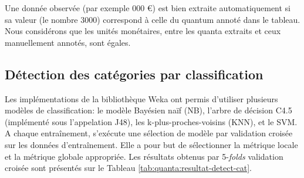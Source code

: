 Une donnée observée (par exemple  000 \euro \fg) est bien extraite automatiquement si sa valeur (le nombre $3000$) correspond à celle du quantum annoté dans le tableau. Nous considérons que les unités monétaires, entre les quanta extraits et ceux manuellement annotés, sont égales.




\subsection{Détection des catégories par classification}
Les implémentations de la bibliothèque Weka \citep{frank2016weka} ont permis d'utiliser plusieurs modèles de classification: le modèle Bayésien naïf (NB), l'arbre de décision C4.5 (implémenté sous l'appelation J48), les k-plus-proches-voisins (KNN), et le SVM. 
 A chaque entraînement, s'exécute une sélection de modèle par validation croisée sur les données d'entraînement. Elle a pour but de sélectionner la métrique locale et la métrique globale appropriée. Les résultats obtenus par 5-\textit{folds} validation croisée sont présentés sur le Tableau \ref{tab:quanta:resultat-detect-cat}.  
 
